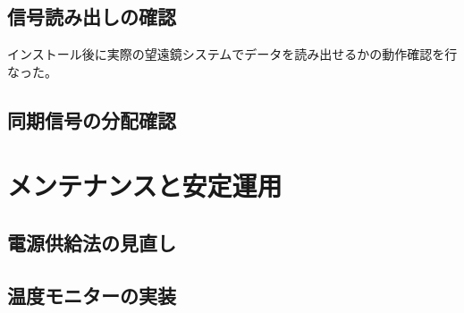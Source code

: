 \subsection{信号読み出しの確認}
インストール後に実際の望遠鏡システムでデータを読み出せるかの動作確認を行なった。

\subsection{同期信号の分配確認}

\section{メンテナンスと安定運用}

\subsection{電源供給法の見直し}

\subsection{温度モニターの実装}
